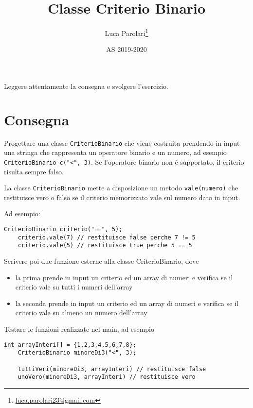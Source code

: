\documentclass[addpoints,12pt,answers]{exam}
\author{Luca Parolari\footnote{\href{mailto:luca.parolari23@gmail.com}{luca.parolari23@gmail.com}}}
\begin{document}
    
    \title{Classe Criterio Binario}
    \date{AS 2019-2020}
    
    \maketitle
    
    Leggere attentamente la consegna e svolgere l'esercizio.
    
    \section{Consegna}

    Progettare una classe \texttt{CriterioBinario} che viene costruita prendendo in input una stringa che rappresenta un operatore binario e un numero, ad esempio \texttt{CriterioBinario c("<", 3)}. Se l'operatore binario non è supportato, il criterio risulta sempre falso.

    La classe \texttt{CriterioBinario} mette a disposizione un metodo \texttt{vale(numero)} che restituisce vero o falso se il criterio memorizzato vale sul numero dato in input.

    Ad esempio:
    \begin{lstlisting}[style=mycpp]
    CriterioBinario criterio("==", 5);
    criterio.vale(7) // restituisce false perche 7 != 5
    criterio.vale(5) // restituisce true perche 5 == 5
    \end{lstlisting}
  
    Scrivere poi due funzione esterne alla classe CriterioBinario, dove
    \begin{itemize}
        \item la prima prende in input un criterio ed un array di numeri e verifica se il criterio vale su tutti i numeri dell'array
        \item la seconda prende in input un criterio ed un array di numeri e verifica se il criterio vale su almeno un numero dell'array
    \end{itemize}

    Testare le funzioni realizzate nel main, ad esempio
    \begin{lstlisting}[style=mycpp]
    int arrayInteri[] = {1,2,3,4,5,6,7,8};
    CriterioBinario minoreDi3("<", 3);
    
    tuttiVeri(minoreDi3, arrayInteri) // restituisce false
    unoVero(minoreDi3, arrayInteri) // restituisce vero
    \end{lstlisting}
    
\end{document}
